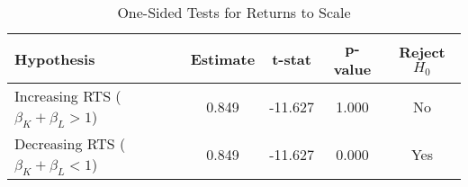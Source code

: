 \begin{table}[H]
\centering
\caption{One-Sided Tests for Returns to Scale}
\label{tab:rts_tests}
\begin{tabular}{lcccc}
\toprule
Hypothesis & Estimate & t-stat & p-value & Reject $H_0$ \\
\midrule
Increasing RTS ($\beta_K + \beta_L > 1$) & 0.849 & -11.627 & 1.000 & No \\
Decreasing RTS ($\beta_K + \beta_L < 1$) & 0.849 & -11.627 & 0.000 & Yes \\
\bottomrule
\end{tabular}
\end{table}
